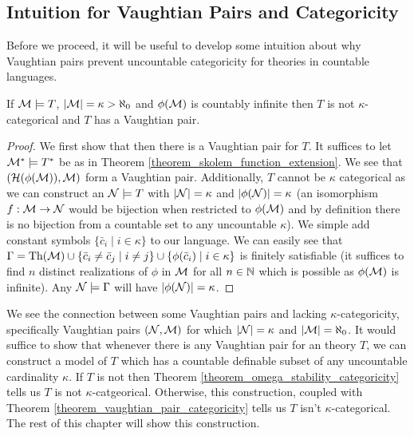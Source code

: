 \subsection{Intuition for Vaughtian Pairs and Categoricity}

Before we proceed, it will be useful to develop some intuition about why Vaughtian pairs prevent uncountable categoricity for theories in countable languages.

\begin{theorem}\label{theorem_vaughtian_pair_categoricity}
If \(\mathcal{M} \models T\), \(|\mathcal{M}| = \kappa > \aleph_0\) and \(\phi(\mathcal{M})\) is countably infinite then \(T\) is not \(\kappa\)-categorical and \(T\) has a Vaughtian pair. 
\end{theorem}

\begin{proof}
We first show that then there is a Vaughtian pair for \(T\).
It suffices to let \(\mathcal{M}^* \models T^*\) be as in Theorem \ref{theorem_skolem_function_extension}.
We see that \((\mathcal{H}(\phi(\mathcal{M})), \mathcal{M})\) form a Vaughtian pair. 
Additionally, \(T\) cannot be \(\kappa\) categorical as we can construct an \(\mathcal{N} \models T\) with \(|\mathcal{N}| = \kappa\) and \(|\phi(\mathcal{N})| = \kappa\) (an isomorphism \(f: \mathcal{M} \to \mathcal{N}\) would be bijection when restricted to \(\phi(\mathcal{M})\) and by definition there is no bijection from a countable set to any uncountable \(\kappa\)).
We simple add constant symbols \(\{\bar{c}_i \mid i \in \kappa\}\) to our language. 
We can easily see that \(\Gamma = \text{Th}(\mathcal{M}) \cup \{\bar{c}_i \neq \bar{c}_j \mid i \neq j\} \cup \{\phi(\bar{c}_i) \mid i \in \kappa\}\) is finitely satisfiable (it suffices to find \(n\) distinct realizations of \(\phi\) in \(\mathcal{M}\) for all \(n \in \mathbb{N}\) which is possible as \(\phi(\mathcal{M})\) is infinite). 
Any \(\mathcal{N} \models \Gamma\) will have \(|\phi(\mathcal{N})| = \kappa\). 
\end{proof}

We see the connection between some Vaughtian pairs and lacking \(\kappa\)-categoricity, specifically Vaughtian pairs \((\mathcal{N}, \mathcal{M})\) for which \(|\mathcal{N}| = \kappa\) and \(|\mathcal{M}| = \aleph_0\).
It would suffice to show that whenever there is any Vaughtian pair for an \omst theory \(T\), we can construct a model of \(T\) which has a countable definable subset of any uncountable cardinality \(\kappa\). 
If \(T\) is not \omst then Theorem \ref{theorem_omega_stability_categoricity} tells us \(T\) is not \(\kappa\)-catgeorical.
Otherwise, this construction, coupled with Theorem \ref{theorem_vaughtian_pair_categoricity} tells us \(T\) isn't \(\kappa\)-categorical.
The rest of this chapter will show this construction. 

